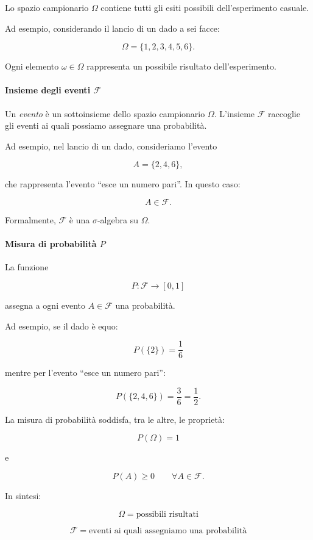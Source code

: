 Lo spazio campionario $\Omega$ contiene tutti gli esiti possibili dell'esperimento casuale.

Ad esempio, considerando il lancio di un dado a sei facce:

$$
\Omega=\{1,2,3,4,5,6\}.
$$

Ogni elemento $\omega\in\Omega$ rappresenta un possibile risultato dell'esperimento.

\paragraph{Insieme degli eventi $\mathcal{F}$}

Un \emph{evento} è un sottoinsieme dello spazio campionario $\Omega$. L'insieme $\mathcal{F}$ raccoglie gli eventi ai quali possiamo assegnare una probabilità.

Ad esempio, nel lancio di un dado, consideriamo l'evento

$$
A=\{2,4,6\},
$$

che rappresenta l'evento ``esce un numero pari''. In questo caso:

$$
A\in\mathcal{F}.
$$

Formalmente, $\mathcal{F}$ è una $\sigma$-algebra su $\Omega$.


\paragraph{Misura di probabilità $P$}

La funzione

$$
P:\mathcal{F}\rightarrow[0,1]
$$

assegna a ogni evento $A\in\mathcal{F}$ una probabilità.

Ad esempio, se il dado è equo:

$$
P(\{2\})=\frac{1}{6}
$$

mentre per l'evento ``esce un numero pari'':

$$
P(\{2,4,6\})=\frac{3}{6}=\frac{1}{2}.
$$

La misura di probabilità soddisfa, tra le altre, le proprietà:

$$
P(\Omega)=1
$$

e

$$
P(A)\geq 0
\qquad\forall A\in\mathcal{F}.
$$

In sintesi:

$$
\boxed{
\Omega=\text{possibili risultati}
}
$$

$$
\boxed{
\mathcal{F}=\text{eventi ai quali assegniamo una probabilità}
}
$$

